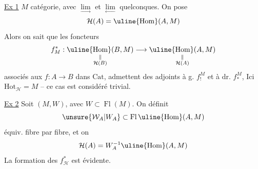 \uline{Ex 1} $M$ catégorie, avec $\underset{\longrightarrow}{\lim}$ et $\underset{\longleftarrow}{\lim}$
quelconques. On pose
\[
\mathcal H(A)=\uline{\operatorname{Hom}}(A,M)
\]
Alors on sait que les foncteurs
\[
f_M^{*}:\underset{\substack{\Vert\\\mathcal H(B)}}{\uline{\operatorname{Hom}}(B,M)}
\longrightarrow
\underset{\substack{\Vert\\\mathcal H(A)}}{\uline{\operatorname{Hom}}(A,M)}
\]
associés aux $f:A\longrightarrow B$ dans $\mathrm{Cat}$, admettent
des adjoints à g. $f_!^M$ et à dr. $f_*^M$,
Ici $\mathrm{Hot}_{\mathcal H}=M$ -- ce cas est
considéré trivial.

\uline{Ex 2} Soit $(M,W)$, avec $W\subset\operatorname{Fl}(M)$.
On définit
\[
\unsure{\mathcal W_A|W_A}\subset\operatorname{Fl}\uline{\operatorname{Hom}}(A,M)
\]
 équiv. fibre par fibre, et on
\[
\mathcal H(A)=W_A^{-1}\uline{\operatorname{Hom}}(A,M)
\]
La formation des $f_{\mathcal H}^{*}$ est évidente.
